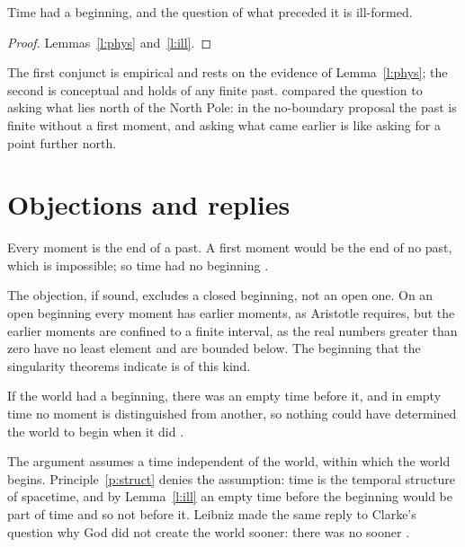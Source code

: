 \documentclass{situationist-preprint}
\begin{document}
\begin{theorem}\label{t:main}
Time had a beginning, and the question of what preceded it is ill-formed.
\end{theorem}

\begin{proof}
Lemmas~\ref{l:phys} and~\ref{l:ill}.
\end{proof}

The first conjunct is empirical and rests on the evidence of Lemma~\ref{l:phys}; the second is conceptual and holds of any finite past. \citet{Hawking1988} compared the question to asking what lies north of the North Pole: in the no-boundary proposal the past is finite without a first moment, and asking what came earlier is like asking for a point further north.

\section{Objections and replies}

\begin{objection}[Aristotle]\label{o:arist}
Every moment is the end of a past. A first moment would be the end of no past, which is impossible; so time had no beginning \citep[VIII.1]{AristotlePhysics}.
\end{objection}

\begin{reply}
The objection, if sound, excludes a closed beginning, not an open one. On an open beginning every moment has earlier moments, as Aristotle requires, but the earlier moments are confined to a finite interval, as the real numbers greater than zero have no least element and are bounded below. The beginning that the singularity theorems indicate is of this kind.
\end{reply}

\begin{objection}[Kant]\label{o:kant}
If the world had a beginning, there was an empty time before it, and in empty time no moment is distinguished from another, so nothing could have determined the world to begin when it did \citep[A427/B455]{KantCPR}.
\end{objection}

\begin{reply}
The argument assumes a time independent of the world, within which the world begins. Principle~\ref{p:struct} denies the assumption: time is the temporal structure of spacetime, and by Lemma~\ref{l:ill} an empty time before the beginning would be part of time and so not before it. Leibniz made the same reply to Clarke's question why God did not create the world sooner: there was no sooner \citep{LeibnizClarke1716}.
\end{reply}
\end{document}
